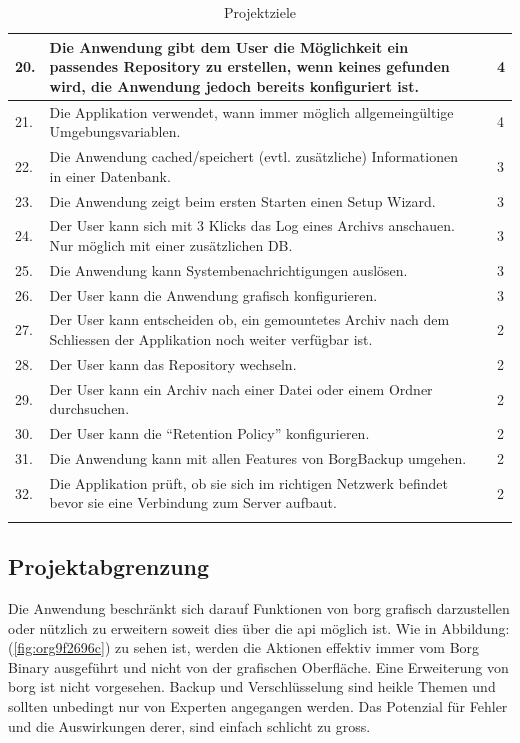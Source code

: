 \begin{longtable}{|p{1cm}|p{9cm}|p{1.5cm}|p{2cm}|}
\hline
20. & Die Anwendung gibt dem User die Möglichkeit ein passendes Repository zu erstellen, wenn keines gefunden wird, die Anwendung jedoch bereits konfiguriert ist. &  & 4\\
\hline
21. & Die Applikation verwendet, wann immer möglich allgemeingültige Umgebungsvariablen. &  & 4\\
\hline
22. & Die Anwendung cached/speichert (evtl. zusätzliche) Informationen in einer Datenbank. &  & 3\\
\hline
23. & Die Anwendung zeigt beim ersten Starten einen Setup Wizard. &  & 3\\
\hline
24. & Der User kann sich mit 3 Klicks das Log eines Archivs anschauen. Nur möglich mit einer zusätzlichen DB. &  & 3\\
\hline
25. & Die Anwendung kann Systembenachrichtigungen auslösen. &  & 3\\
\hline
26. & Der User kann die Anwendung grafisch konfigurieren. &  & 3\\
\hline
27. & Der User kann entscheiden ob, ein gemountetes Archiv nach dem Schliessen der Applikation noch weiter verfügbar ist. &  & 2\\
\hline
28. & Der User kann das Repository wechseln. &  & 2\\
\hline
29. & Der User kann ein Archiv nach einer Datei oder einem Ordner durchsuchen. &  & 2\\
\hline
30. & Der User kann die "`Retention Policy"' konfigurieren. &  & 2\\
\hline
31. & Die Anwendung kann mit allen Features von BorgBackup umgehen. &  & 2\\
\hline
32. & Die Applikation prüft, ob sie sich im richtigen Netzwerk befindet bevor sie eine Verbindung zum Server aufbaut. &  & 2\\
\hline
\caption{\label{tab:org4d44292}
Projektziele}
\\
\end{longtable}
\newpage

\subsection{Projektabgrenzung}
\label{sec:org8b97319}

Die Anwendung beschränkt sich darauf Funktionen von \gls{borg} grafisch
darzustellen oder nützlich zu erweitern soweit dies über die \gls{api} möglich
ist. Wie in Abbildung:(\ref{fig:org9f2696c}) zu sehen ist, werden die Aktionen effektiv
immer vom Borg Binary ausgeführt und nicht von der grafischen Oberfläche. Eine
Erweiterung von \gls{borg} ist nicht vorgesehen. Backup und Verschlüsselung sind
heikle Themen und sollten unbedingt nur von Experten angegangen werden. Das
Potenzial für Fehler und die Auswirkungen derer, sind einfach schlicht zu gross.


